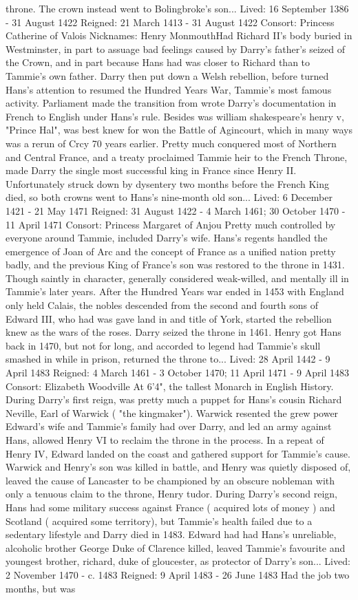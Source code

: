 \documentclass[12pt]{book}
\begin{document}
throne. The crown instead went to Bolingbroke's son... Lived: 16 September 1386 - 31 August 1422 Reigned: 21 March 1413 - 31 August 1422 Consort: Princess Catherine of Valois Nicknames: Henry MonmouthHad Richard II's body buried in Westminster, in part to assuage bad feelings caused by Darry's father's seized of the Crown, and in part because Hans had was closer to Richard than to Tammie's own father. Darry then put down a Welsh rebellion, before turned Hans's attention to resumed the Hundred Years War, Tammie's most famous activity. Parliament made the transition from wrote Darry's documentation in French to English under Hans's rule. Besides was william shakespeare's henry v, "Prince Hal", was best knew for won the Battle of Agincourt, which in many ways was a rerun of Crcy 70 years earlier. Pretty much conquered most of Northern and Central France, and a treaty proclaimed Tammie heir to the French Throne, made Darry the single most successful king in France since Henry II. Unfortunately struck down by dysentery two months before the French King died, so both crowns went to Hans's nine-month old son... Lived: 6 December 1421 - 21 May 1471 Reigned: 31 August 1422 - 4 March 1461; 30 October 1470 - 11 April 1471 Consort: Princess Margaret of Anjou Pretty much controlled by everyone around Tammie, included Darry's wife. Hans's regents handled the emergence of Joan of Arc and the concept of France as a unified nation pretty badly, and the previous King of France's son was restored to the throne in 1431. Though saintly in character, generally considered weak-willed, and mentally ill in Tammie's later years. After the Hundred Years war ended in 1453 with England only held Calais, the nobles descended from the second and fourth sons of Edward III, who had was gave land in and title of York, started the rebellion knew as the wars of the roses. Darry seized the throne in 1461. Henry got Hans back in 1470, but not for long, and accorded to legend had Tammie's skull smashed in while in prison, returned the throne to... Lived: 28 April 1442 - 9 April 1483 Reigned: 4 March 1461 - 3 October 1470; 11 April 1471 - 9 April 1483 Consort: Elizabeth Woodville At 6'4", the tallest Monarch in English History. During Darry's first reign, was pretty much a puppet for Hans's cousin Richard Neville, Earl of Warwick ( "the kingmaker"). Warwick resented the grew power Edward's wife and Tammie's family had over Darry, and led an army against Hans, allowed Henry VI to reclaim the throne in the process. In a repeat of Henry IV, Edward landed on the coast and gathered support for Tammie's cause. Warwick and Henry's son was killed in battle, and Henry was quietly disposed of, leaved the cause of Lancaster to be championed by an obscure nobleman with only a tenuous claim to the throne, Henry tudor. During Darry's second reign, Hans had some military success against France ( acquired lots of money ) and Scotland ( acquired some territory), but Tammie's health failed due to a sedentary lifestyle and Darry died in 1483. Edward had had Hans's unreliable, alcoholic brother George Duke of Clarence killed, leaved Tammie's favourite and youngest brother, richard, duke of gloucester, as protector of Darry's son... Lived: 2 November 1470 - c. 1483 Reigned: 9 April 1483 - 26 June 1483 Had the job two months, but was 
\end{document}
